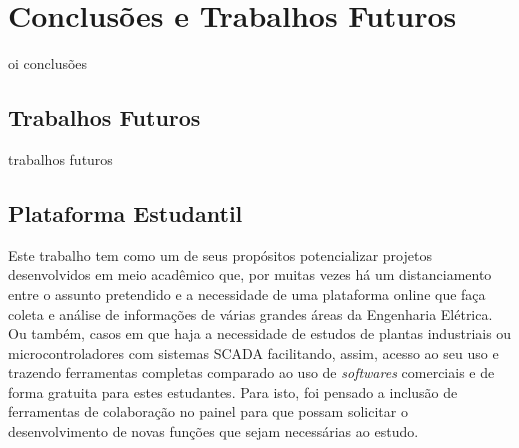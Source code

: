 \chapter{Conclusões e Trabalhos Futuros}
\label{chap:conclusoes-e-trabalhos-futuros}

oi conclusões

\section{Trabalhos Futuros}
\label{sec:trabalhos-futuros}

trabalhos futuros

\section{Plataforma Estudantil}
\label{sec:plataforma-estudantil}

Este trabalho tem como um de seus propósitos potencializar projetos desenvolvidos em meio acadêmico que, por muitas vezes há um distanciamento entre o assunto pretendido e a necessidade de uma plataforma online que faça coleta e análise de informações de várias grandes áreas da Engenharia Elétrica. Ou também, casos em que haja a necessidade de estudos de plantas industriais ou microcontroladores com sistemas \gls{SCADA} facilitando, assim, acesso ao seu uso e trazendo ferramentas completas comparado ao uso de \textit{softwares} comerciais e de forma gratuita para estes estudantes. Para isto, foi pensado a inclusão de ferramentas de colaboração no painel para que possam solicitar o desenvolvimento de novas funções que sejam necessárias ao estudo.